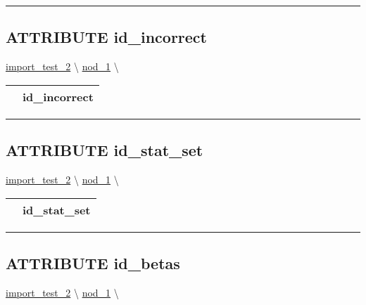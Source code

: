 \rule{\linewidth}{0.5pt}
\subsection*{\textsf{\colorbox{headtoc}{\color{white} ATTRIBUTE}
id\_incorrect}}

\hypertarget{ecldoc:constants.id_incorrect}{}
\hspace{0pt} \hyperlink{ecldoc:import_test_2}{import_test_2} \textbackslash 
\hspace{0pt} \hyperlink{ecldoc:Constants}{nod_1} \textbackslash 

{\renewcommand{\arraystretch}{1.5}
\begin{tabularx}{\textwidth}{|>{\raggedright\arraybackslash}l|X|}
\hline
\hspace{0pt}\mytexttt{\color{red} } & \textbf{id\_incorrect} \\
\hline
\end{tabularx}
}

\par


\rule{\linewidth}{0.5pt}
\subsection*{\textsf{\colorbox{headtoc}{\color{white} ATTRIBUTE}
id\_stat\_set}}

\hypertarget{ecldoc:constants.id_stat_set}{}
\hspace{0pt} \hyperlink{ecldoc:import_test_2}{import_test_2} \textbackslash 
\hspace{0pt} \hyperlink{ecldoc:Constants}{nod_1} \textbackslash 

{\renewcommand{\arraystretch}{1.5}
\begin{tabularx}{\textwidth}{|>{\raggedright\arraybackslash}l|X|}
\hline
\hspace{0pt}\mytexttt{\color{red} } & \textbf{id\_stat\_set} \\
\hline
\end{tabularx}
}

\par


\rule{\linewidth}{0.5pt}
\subsection*{\textsf{\colorbox{headtoc}{\color{white} ATTRIBUTE}
id\_betas}}

\hypertarget{ecldoc:constants.id_betas}{}
\hspace{0pt} \hyperlink{ecldoc:import_test_2}{import_test_2} \textbackslash 
\hspace{0pt} \hyperlink{ecldoc:Constants}{nod_1} \textbackslash 

